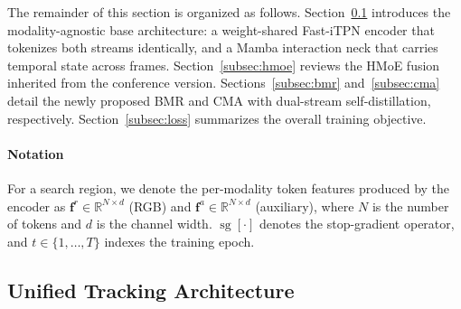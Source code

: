 
The remainder of this section is organized as follows. 
Section~\ref{subsec:arch} introduces the modality-agnostic base architecture: a weight-shared Fast-iTPN encoder that tokenizes both streams identically, and a Mamba interaction neck that carries temporal state across frames.
Section~\ref{subsec:hmoe} reviews the HMoE fusion inherited from the conference version.
Sections~\ref{subsec:bmr} and~\ref{subsec:cma} detail the newly proposed BMR and CMA with dual-stream self-distillation, respectively.
Section~\ref{subsec:loss} summarizes the overall training objective.


\paragraph*{Notation}
For a search region, we denote the per-modality token features produced by the encoder as $\mathbf{f}^{r}\!\in\!\mathbb{R}^{N\times d}$ (RGB) and $\mathbf{f}^{a}\!\in\!\mathbb{R}^{N\times d}$ (auxiliary), where $N$ is the number of tokens and $d$ is the channel width. $\operatorname{sg}[\cdot]$ denotes the stop-gradient operator, and $t\!\in\!\{1,\dots,T\}$ indexes the training epoch.

\subsection{Unified Tracking Architecture}
\label{subsec:arch}

